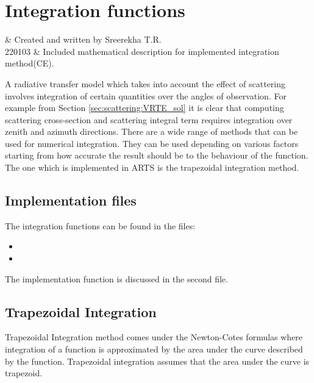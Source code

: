 \chapter{Integration functions}
\label{sec:integration}

 & Created and written by Sreerekha T.R.\\
  220103 & Included mathematical description for implemented integration method(CE).\\
\stophistory

%
%
A radiative transfer model which takes into account the effect of
scattering involves integration of certain quantities over the angles
of observation.  For example from Section \ref{sec:scattering:VRTE_sol} it
is clear that computing  
scattering cross-section  and scattering integral term requires
integration over zenith and azimuth directions. There are a wide range of
methods that can be used for numerical integration. They can be used
depending on various factors starting from how accurate the result
should be to the behaviour of the function. The one which is
implemented in ARTS is the trapezoidal integration method. 


\section{Implementation files}
\label{sec:integration:files}

The integration functions can be found in the files:
\begin{itemize}
\item {}
\item {}
\end{itemize}
The implementation function is
discussed in the second file. 

\section{Trapezoidal Integration}
\label{sec:integration:trapezoidal}

Trapezoidal Integration method comes under the Newton-Cotes formulas
where integration of a function is approximated by the area under the
curve described by the function.  Trapezoidal integration assumes that
the area under the curve is trapezoid.  

